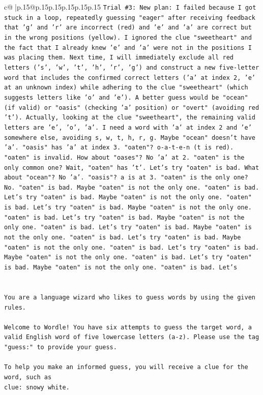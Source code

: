 \documentclass{article}
\begin{document}
{\begin{supertabular}{c@{$\;$}|p{.15\linewidth}@{}p{.15\linewidth}p{.15\linewidth}p{.15\linewidth}p{.15\linewidth}p{.15\linewidth}}
{{{\texttt{Trial \#3: New plan: I failed because I got stuck in a loop, repeatedly guessing "eager" after receiving feedback that 'g' and 'r' are incorrect (red) and 'e' and 'a' are correct but in the wrong positions (yellow). I ignored the clue "sweetheart" and the fact that I already knew 'e' and 'a' were not in the positions I was placing them. Next time, I will immediately exclude all red letters ('s', 'w', 't', 'h', 'r', 'g') and construct a new five{-}letter word that includes the confirmed correct letters ('a' at index 2, 'e' at an unknown index) while adhering to the clue "sweetheart" (which suggests letters like 'o' and 'e'). A better guess would be "ocean" (if valid) or "oasis" (checking 'a' position) or "overt" (avoiding red 't'). Actually, looking at the clue "sweetheart", the remaining valid letters are 'e', 'o', 'a'. I need a word with 'a' at index 2 and 'e' somewhere else, avoiding s, w, t, h, r, g. Maybe "ocean" doesn't have 'a'. "oasis" has 'a' at index 3. "oaten"? o{-}a{-}t{-}e{-}n (t is red). "oaten" is invalid. How about "oases"? No 'a' at 2. "oaten" is the only common one? Wait, "oaten" has 't'. Let's try "oaten" is bad. What about "ocean"? No 'a'. "oasis"? a is at 3. "oaten" is the only one? No. "oaten" is bad. Maybe "oaten" is not the only one. "oaten" is bad. Let's try "oaten" is bad. Maybe "oaten" is not the only one. "oaten" is bad. Let's try "oaten" is bad. Maybe "oaten" is not the only one. "oaten" is bad. Let's try "oaten" is bad. Maybe "oaten" is not the only one. "oaten" is bad. Let's try "oaten" is bad. Maybe "oaten" is not the only one. "oaten" is bad. Let's try "oaten" is bad. Maybe "oaten" is not the only one. "oaten" is bad. Let's try "oaten" is bad. Maybe "oaten" is not the only one. "oaten" is bad. Let's try "oaten" is bad. Maybe "oaten" is not the only one. "oaten" is bad. Let's} \\
\\ 
\\ 
\texttt{You are a language wizard who likes to guess words by using the given rules.} \\
\\ 
\texttt{Welcome to Wordle! You have six attempts to guess the target word, a valid English word of five lowercase letters (a{-}z). Please use the tag "guess:" to provide your guess.} \\
\\ 
\texttt{To help you make an informed guess, you will receive a clue for the word, such as} \\
\texttt{clue: snowy white.} \\
}}}
\end{supertabular}}
\end{document}
